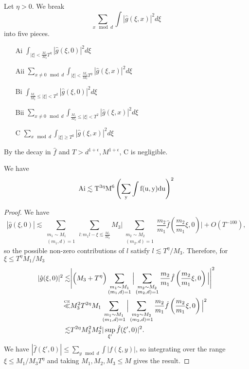 Let $\eta>0$. We break \[
\sum_{x\mod d} \int |\hat{g}(\xi,x)|^2 d\xi
\]
into five pieces. \begin{enumerate}
    \item [Ai] $\int_{|\xi|<\frac{M_1}{M_3}T^\eta} |\hat{g}(\xi,0)|^2 d\xi$
    \item [Aii]$\sum_{x\neq 0 \mod d}\int_{|\xi|<\frac{M_1}{M_3}T^\eta} |\hat{g}(\xi,x)|^2 d\xi$
    \item [Bi] $\int_{\frac{M_1}{M_3}\leq|\xi|<T^2} |\hat{g}(\xi,0)|^2 d\xi$
    \item [Bii]$\sum_{x\neq 0 \mod d}\int_{\frac{M_1}{M_3}\leq|\xi|<T^2} |\hat{g}(\xi,x)|^2 d\xi$
    \item [C]  $\sum_{x \mod d}\int_{|\xi|\geq T^2} |\hat{g}(\xi,x)|^2 d\xi$
\end{enumerate}
By the decay in $\hat{f}$ and $T>d^{1+\epsilon}, M^{1+\epsilon}$, C is negligible. 

\begin{lemma}[Ai bound]\label{affinemainterm}
    We have \[
    \rm{Ai} \lesssim T^{3\eta}M^6\left(\sum_y \int f(u,y) du\right)^2
    \]
\end{lemma}
\begin{proof}
    We have
    \[
        |\hat{g}(\xi,0)|\lesssim 
        \sum_{\substack{m_1\sim M_1\\(m_1,d)=1}} 
        \sum_{l : m_1l- \xi \lesssim \frac{M_1}{M_3} }M_3\Bigg|
        \sum_{\substack{m_2\sim M_2\\(m_2,d)=1}} \frac{m_2}{m_1}\hat{f}\left(\frac{m_2}{m_1}\xi, 0\right) 
        \Bigg|+ O(T^{-100}),
    \]
    so the possible non-zero contributions of $l$ satisfy $l\lesssim T^\eta/M_3$. Therefore, for $\xi\leq T^\eta M_1/M_3$\begin{align*}
    |\hat{g}(\xi,0)|^2 \lesssim& \Bigg|\Big(M_3+T^\eta\Big)\sum_{\substack{m_1\sim M_1\\(m_1,d)=1}} 
    \Big|
        \sum_{\substack{m_2\sim M_2\\(m_2,d)=1}} \frac{m_2}{m_1}\hat{f}\left(\frac{m_2}{m_1}\xi, 0\right) 
        \Big| \Bigg|^2\\
        \stackon{CS}{\ll}& M_3^2T^{2\eta} M_1\sum_{\substack{m_1\sim M_1\\(m_1,d)=1}} 
        \Big|\sum_{\substack{m_2\sim M_2\\(m_2,d)=1}} \frac{m_2}{m_1}\hat{f}\left(\frac{m_2}{m_1}\xi, 0\right) \Big|^2\\
        \lesssim & T^{2\eta}M_3^2M_2^4 |\sup_{\xi'} \hat{f}(\xi',0)|^2.
    \end{align*}
    We have $|\hat{f}(\xi',0)|\leq \sum_{y\mod d}\int |f(\xi,y)|$,
    so integrating over the range $\xi\leq M_1/M_3 T^\eta$ and taking $M_1,M_2,M_3\leq M$ gives the result.
\end{proof}


